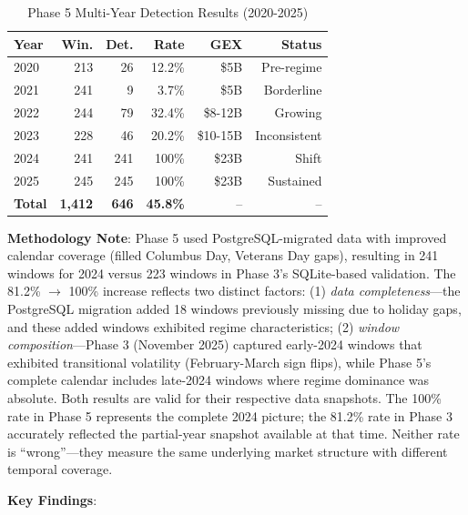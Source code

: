 \begin{table}[ht]
\centering
\caption{Phase 5 Multi-Year Detection Results (2020-2025)}
\footnotesize
\begin{tabular}{@{}lrrrrr@{}}
\toprule
\textbf{Year} & \textbf{Win.} & \textbf{Det.} & \textbf{Rate} & \textbf{GEX} & \textbf{Status} \\
\midrule
2020 & 213 & 26 & 12.2\% & \$5B & Pre-regime \\
2021 & 241 & 9 & 3.7\% & \$5B & Borderline \\
2022 & 244 & 79 & 32.4\% & \$8-12B & Growing \\
2023 & 228 & 46 & 20.2\% & \$10-15B & Inconsistent \\
2024 & 241 & 241 & 100\% & \$23B & Shift \\
2025 & 245 & 245 & 100\% & \$23B & Sustained \\
\midrule
\textbf{Total} & \textbf{1,412} & \textbf{646} & \textbf{45.8\%} & -- & -- \\
\bottomrule
\end{tabular}
\end{table}

\vspace{0.2cm}

\noindent\textbf{Methodology Note}: Phase 5 used PostgreSQL-migrated data with improved calendar coverage (filled Columbus Day, Veterans Day gaps), resulting in 241 windows for 2024 versus 223 windows in Phase 3's SQLite-based validation. The 81.2\% $\rightarrow$ 100\% increase reflects two distinct factors: (1) \textit{data completeness}---the PostgreSQL migration added 18 windows previously missing due to holiday gaps, and these added windows exhibited regime characteristics; (2) \textit{window composition}---Phase 3 (November 2025) captured early-2024 windows that exhibited transitional volatility (February-March sign flips), while Phase 5's complete calendar includes late-2024 windows where regime dominance was absolute. Both results are valid for their respective data snapshots. The 100\% rate in Phase 5 represents the complete 2024 picture; the 81.2\% rate in Phase 3 accurately reflected the partial-year snapshot available at that time. Neither rate is ``wrong''---they measure the same underlying market structure with different temporal coverage.

\vspace{0.2cm}

\noindent\textbf{Key Findings}:

\vspace{0.1cm}

